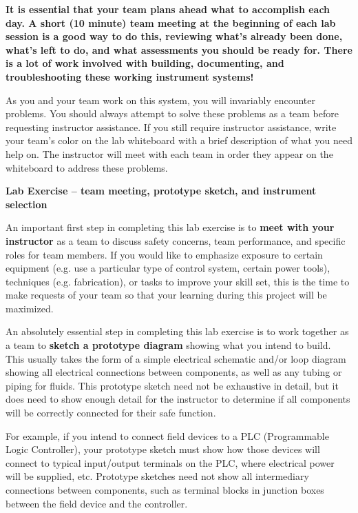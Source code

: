 \begin{itemize}
\vskip 10pt

{\bf It is essential that your team plans ahead what to accomplish each day.  A short (10 minute) team meeting at the beginning of each lab session is a good way to do this, reviewing what's already been done, what's left to do, and what assessments you should be ready for.  There is a lot of work involved with building, documenting, and troubleshooting these working instrument systems!}

As you and your team work on this system, you will invariably encounter problems.  You should always attempt to solve these problems as a team before requesting instructor assistance.  If you still require instructor assistance, write your team's color on the lab whiteboard with a brief description of what you need help on.  The instructor will meet with each team in order they appear on the whiteboard to address these problems.




\vfil \eject

\noindent
{\bf Lab Exercise -- team meeting, prototype sketch, and instrument selection}

\vskip 5pt

An important first step in completing this lab exercise is to {\bf meet with your instructor} as a team to discuss safety concerns, team performance, and specific roles for team members.  If you would like to emphasize exposure to certain equipment (e.g. use a particular type of control system, certain power tools), techniques (e.g. fabrication), or tasks to improve your skill set, this is the time to make requests of your team so that your learning during this project will be maximized.

\vskip 10pt

An absolutely essential step in completing this lab exercise is to work together as a team to {\bf sketch a prototype diagram} showing what you intend to build.  This usually takes the form of a simple electrical schematic and/or loop diagram showing all electrical connections between components, as well as any tubing or piping for fluids.  This prototype sketch need not be exhaustive in detail, but it does need to show enough detail for the instructor to determine if all components will be correctly connected for their safe function.

For example, if you intend to connect field devices to a PLC (Programmable Logic Controller), your prototype sketch must show how those devices will connect to typical input/output terminals on the PLC, where electrical power will be supplied, etc.  Prototype sketches need not show all intermediary connections between components, such as terminal blocks in junction boxes between the field device and the controller.


\end{itemize}
